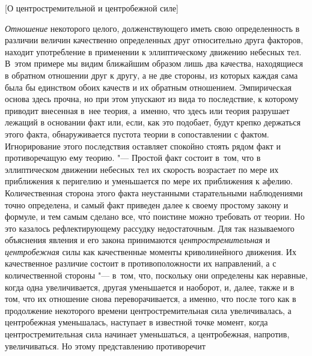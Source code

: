 %
{[О центростремительной и центробежной силе]}

{\em Отношение} некоторого целого, долженствующего иметь свою определенность в
различии величин качественно определенных друг относительно друга факторов,
находит употребление в применении к эллиптическому движению небесных тел.
В~этом примере мы видим ближайшим образом лишь два качества, находящиеся в
обратном отношении друг к другу, а не две стороны, из которых каждая сама была
бы единством обоих качеств и их обратным отношением. Эмпирическая основа здесь
прочна, но при этом упускают из вида то последствие, к которому приводит
внесенная в~нее теория, а~именно, что здесь или теория разрушает лежащий в
основании факт или, если, как это подобает, будут крепко держаться этого факта,
обнаруживается пустота теории в сопоставлении с фактом. Игнорирование этого
последствия оставляет спокойно стоять рядом факт и противоречащую ему теорию.
"--- Простой факт состоит в~том, что в эллиптическом движении небесных тел их
скорость возрастает по мере их приближения к перигелию и уменьшается по мере их
приближения к афелию. Количественная сторона этого факта неустанными
старательными наблюдениями точно определена, и самый факт приведен далее к
своему простому закону и формуле, и тем самым сделано все, чт\'{о} поистине
можно требовать от теории. Но это казалось рефлектирующему рассудку
недостаточным. Для так называемого объяснения явления и его закона принимаются
{\em центростремительная} и {\em центробежная} силы как качественные моменты
криволинейного движения. Их качественное различие состоит в противоположности
их направлений, а с количественной стороны "--- в~том, что, поскольку они
определены как неравные, когда одна увеличивается, другая уменьшается и
наоборот, и, далее, также и в том, что их отношение снова переворачивается, а
именно, что после того как в продолжение некоторого времени центростремительная
сила увеличивалась, а центробежная уменьшалась, наступает в известной точке
момент, когда центростремительная сила начинает уменьшаться, а центробежная,
напротив, увеличиваться. Но этому представлению противоречит
